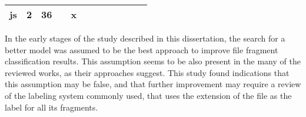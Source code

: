 \begin{table}[!ht]
\begin{tabular}{|l|l|l|l|l|l|l|l|l|l|l|l|}
js        & 2               & 36            &   & x &   &   &   &   &   &   &     \\ \hline
\end{tabular}
\end{table}


In the early stages of the study described in this dissertation, the search for a better model was assumed to be the best approach to improve file fragment classification results. This assumption seems to be also present in the many of the reviewed works, as their approaches suggest. This study found indications that this assumption may be false, and that further improvement may require a review of the labeling system commonly used, that uses the extension of the file as the label for all its fragments.
